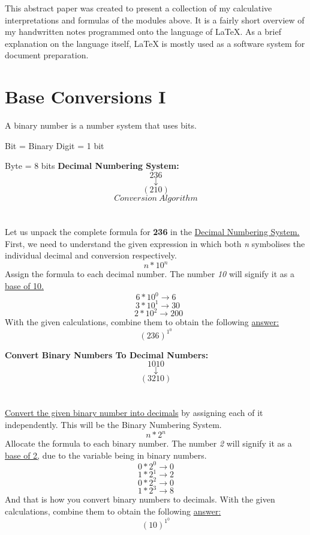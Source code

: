 \documentclass{article}
\begin{document}
This abstract paper was created to present a collection of my calculative interpretations and formulas of the modules above. It is a fairly short overview of my handwritten notes programmed onto the language of LaTeX. As a brief explanation on the language itself, LaTeX is mostly used as a software system for document preparation.

\section{Base Conversions I}
A binary number is a number system that uses bits.

Bit = Binary Digit = 1 bit

Byte = 8 bits
\newline
\newline
\textbf{Decimal Numbering System:}
\newline
$$236$$
$$\downarrow$$
$$(210)$$
$$Conversion\: Algorithm$$
\section*{}
Let us unpack the complete formula for \textbf{236} in the \underline{Decimal Numbering System.}
First, we need to understand the given expression in which both \emph{n} symbolises the individual decimal and conversion respectively. 
$$n*10^n$$
Assign the formula to each decimal number. The number \emph{10} will signify it as a \underline{base of 10.}
$$6*10^0 \to 6 $$
$$\:\:3*10^1 \to 30 $$
$$\:\:\:2*10^2 \to 200 $$
With the given calculations, combine them to obtain the following \underline{answer:}
$$(236)^1^0$$

\newpage
\textbf{Convert Binary Numbers To Decimal Numbers:}
\newline
$$1010$$
$$\downarrow$$
$$(3210)$$
\section*{}
\underline{Convert the given binary number into decimals} by assigning each of it independently. This will be the Binary Numbering System.
$$n*2^n$$
Allocate the formula to each binary number. The number \emph{2} will signify it as a \underline{base of 2,} due to the variable being in binary numbers.
$$0*2^0 \to 0$$
$$1*2^1 \to 2$$
$$0*2^2 \to 0$$
$$1*2^3 \to 8$$
And that is how you convert binary numbers to decimals. With the given calculations, combine them to obtain the following \underline{answer:}
$$(10)^1^0$$
\newline
\end{document}
